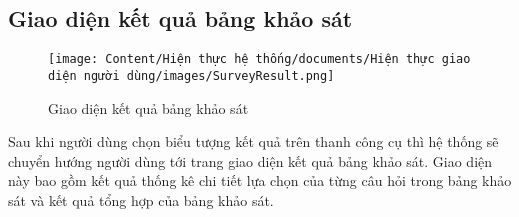 \subsection{Giao diện kết quả bảng khảo sát}

\begin{figure}[H]
    \centering
    \texttt{[image: Content/Hiện thực hệ thống/documents/Hiện thực giao diện người dùng/images/SurveyResult.png]}
    \vspace{0.5cm}
    \caption{Giao diện kết quả bảng khảo sát}
    \label{fig: Giao diện kết quả bảng khảo sát}
\end{figure}

Sau khi người dùng chọn biểu tượng kết quả trên thanh công cụ thì hệ thống sẽ chuyển hướng người dùng tới trang giao diện kết quả bảng khảo sát. Giao diện này bao gồm kết quả thống kê chi tiết lựa chọn của từng câu hỏi trong bảng khảo sát và kết quả tổng hợp của bảng khảo sát.